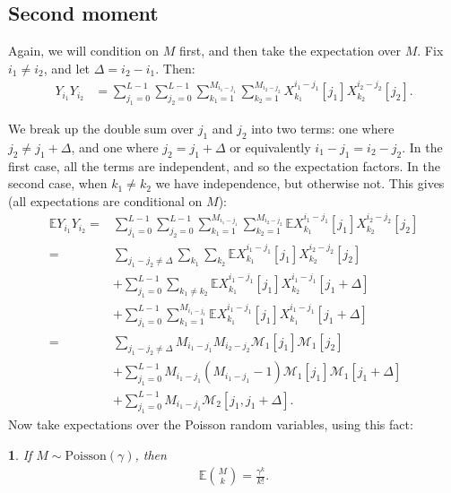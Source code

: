 \documentclass[12pt]{article}
\newcommand{\E}{\mathbb{E}}
\newcommand{\1}{\mathbf{1}}
\newcommand{\Poisson}{\text{Poisson}}
\newcommand{\M}{\mathcal{M}}
\theoremstyle{plain}
\theoremstyle{definition}
\theoremstyle{remark}
\theoremstyle{plain}
\newtheorem{lem}[thm]{\protect\lemmaname}
\theoremstyle{remark}
\theoremstyle{plain}
\theoremstyle{plain}
\theoremstyle{plain}
\providecommand{\lemmaname}{Lemma}
\numberwithin{equation}{section}
\begin{document}
%


\subsection{Second moment}

Again, we will condition on $M$ first, and then take the expectation over $M$. Fix $i_1 \ne i_2$, and let $\Delta = i_2 - i_1$. Then:
%
\begin{align}
%
Y_{i_1} Y_{i_2} 
&= \sum_{j_1=0}^{L-1} \sum_{j_2=0}^{L-1} 
\sum_{k_1=1}^{M_{i_1-j_1}}\sum_{k_2=1}^{M_{i_2-j_2}}
X_{k_1}^{i_1-j_1}[j_1] X_{k_2}^{i_2 - j_2}[j_2].
%
\end{align}

We break up the double sum over $j_1$ and $j_2$ into two terms: one where $j_2 \ne j_1 + \Delta$, and one where $j_2 = j_1 + \Delta$ or equivalently $i_1-j_1 = i_2-j_2$. In the first case, all the terms are independent, and so the expectation factors. In the second case, when $k_1 \ne k_2$ we have independence, but otherwise not. This gives (all expectations are conditional on $M$):
%
\begin{align} \label{moment2-condm}
%
\E Y_{i_1} Y_{i_2}
=& \sum_{j_1=0}^{L-1} \sum_{j_2=0}^{L-1} 
\sum_{k_1=1}^{M_{i_1-j_1}}\sum_{k_2=1}^{M_{i_2-j_2}}
\E X_{k_1}^{i_1-j_1}[j_1] X_{k_2}^{i_2 - j_2}[j_2]
\nonumber \\
=& \sum_{j_1 - j_2 \ne \Delta} \sum_{k_1} 
\sum_{k_2} \E X_{k_1}^{i_1-j_1}[j_1] X_{k_2}^{i_2 - j_2}[j_2]
\nonumber \\
& + \sum_{j_1 = 0}^{L-1} \sum_{k_1 \ne k_2} 
\E X_{k_1}^{i_1-j_1}[j_1] X_{k_2}^{i_1 - j_1}[j_1+\Delta]
\nonumber \\
& + \sum_{j_1 = 0}^{L-1} \sum_{k_1=1}^{M_{i_1-j_1}} 
\E X_{k_1}^{i_1-j_1}[j_1] X_{k_1}^{i_1-j_1}[j_1 + \Delta] 
\nonumber \\
=& \sum_{j_1 - j_2 \ne \Delta} M_{i_1-j_1} M_{i_2 - j_2} \M_1[j_1] \M_1[j_2]
\nonumber \\
& + \sum_{j_1 = 0}^{L-1} M_{i_1-j_1}(M_{i_1-j_1} - 1) \M_1[j_1] \M_1[j_1 + \Delta]
\nonumber \\
& + \sum_{j_1 = 0}^{L-1} M_{i_1-j_1} \M_2[j_1,j_1 + \Delta] .
%
\end{align}
%
Now take expectations over the Poisson random variables, using this fact:
%
\begin{lem} \label{lem-choose}
	If $M \sim \Poisson(\gamma)$, then 
	\begin{align}
	\E {M\choose k} = \frac{\gamma^k}{k!}.
	\end{align}
\end{lem}
\end{document}
